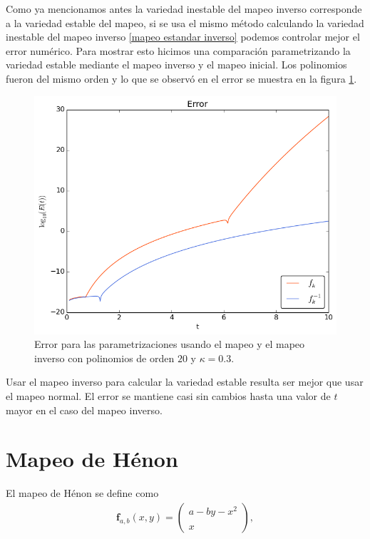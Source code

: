 Como ya mencionamos antes la variedad inestable del mapeo inverso corresponde a la variedad estable del mapeo, si se usa el mismo método calculando la variedad inestable del mapeo inverso \eqref{mapeo estandar inverso} podemos controlar mejor el error numérico. Para mostrar esto hicimos una comparación parametrizando la variedad estable mediante el mapeo inverso y el mapeo inicial. Los polinomios fueron del mismo orden y lo que se observó en el error se muestra en la figura \ref{erroresinverso}.


\begin{figure}[H]
\centering
\includegraphics[scale=0.6]{mapeoinver}
\caption{Error para las parametrizaciones usando el mapeo y el mapeo inverso con polinomios de orden $20$ y $\kappa=0.3$. }
\label{erroresinverso}
\end{figure}

Usar el mapeo inverso para calcular la variedad estable resulta ser mejor que usar el mapeo normal. El error se mantiene casi sin cambios hasta una valor de $t$ mayor en el caso del mapeo inverso. 




\label{henon-seccion}\section{Mapeo de Hénon}
El mapeo de Hénon se define como \cite{devaney}
\begin{eqnarray}
\mathbf{f}_{a,b}(x,y)=\left( \begin{array}{lcc}
             a-by-x^{2}\\
             \\ x
             \end{array}
             \right), \label{Henon}
\end{eqnarray}

